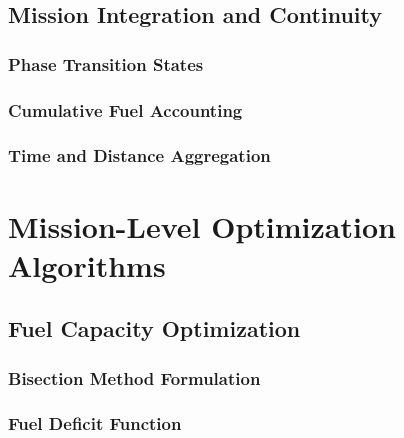 \documentclass[12pt, a4paper]{report}
\begin{document}
\subsection{Mission Integration and Continuity}
\label{subsec:mission_integration}


\subsubsection{Phase Transition States}


\subsubsection{Cumulative Fuel Accounting}


\subsubsection{Time and Distance Aggregation}




 
\section{Mission-Level Optimization Algorithms}
\label{sec:mission_level_optimization}


\subsection{Fuel Capacity Optimization}
\label{subsec:fuel_capacity_optimization}


\subsubsection{Bisection Method Formulation}


\subsubsection{Fuel Deficit Function}

\end{document}
